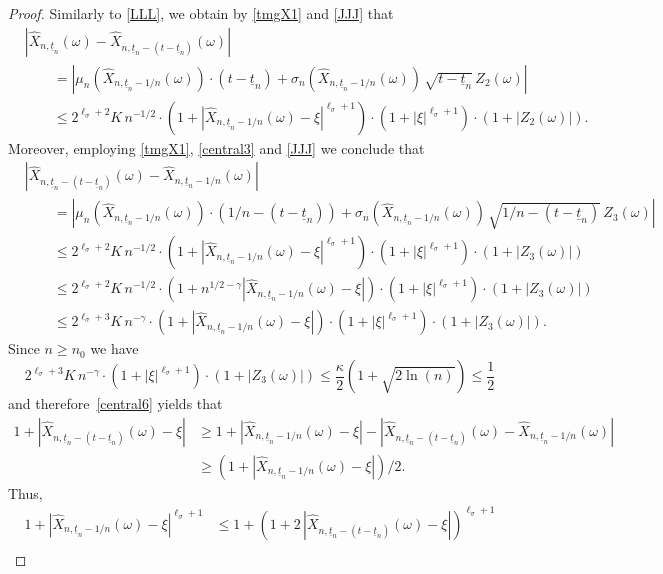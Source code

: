 \documentclass[11pt]{amsart}
\newcommand{\eul}{{\widehat X}}
\newcommand{\utn}{\underline {t}_n}
\theoremstyle{plain}
\theoremstyle{definition}
\begin{document}
\begin{proof}
Similarly to \eqref{LLL}, we obtain by \eqref{tmgX1}
and \eqref{JJJ} that
\begin{equation}\label{central5}
\begin{aligned}
& |\eul_{n,\utn}(\omega)-\eul_{n,\utn-(t-\utn)}(\omega)| \\
& \qquad =
|\mu_n(\eul_{n,\utn-1/n}(\omega))\cdot (t-\utn) + \sigma_n(\eul_{n,\utn-1/n}(\omega))\, \sqrt{t-\utn}\, Z_2(\omega)|\\
& \qquad\leq 2^{\ell_\sigma+2}K\,n^{-1/2}\cdot(1+|\eul_{n,\utn-1/n}(\omega)-\xi|^{\ell_\sigma+1})\cdot(1+|\xi|^{\ell_\sigma+1})\cdot (1+  |Z_2(\omega)|).
\end{aligned}
\end{equation}
Moreover, employing  \eqref{tmgX1}, \eqref{central3} and \eqref{JJJ} we conclude that
\begin{equation}\label{central6}
\begin{aligned}
& |\eul_{n,\utn-(t-\utn)}(\omega)-\eul_{n,\utn-1/n}(\omega)|\\
& \qquad= |\mu_n(\eul_{n,\utn-1/n}(\omega))\cdot (1/n -(t-\utn)) + \sigma_n(\eul_{n,\utn-1/n}(\omega))\, \sqrt{1/n-(t-\utn)}\, Z_3(\omega)| \\
& \qquad\leq 2^{\ell_\sigma+2}K\,n^{-1/2}\cdot(1+|\eul_{n,\utn-1/n}(\omega)-\xi|^{\ell_\sigma+1})\cdot(1+|\xi|^{\ell_\sigma+1})\cdot (1+  |Z_3(\omega)|)\\
& \qquad\leq 2^{\ell_\sigma+2}K\,n^{-1/2}\cdot(1+n^{1/2-\gamma}|\eul_{n,\utn-1/n}(\omega)-\xi|)\cdot(1+|\xi|^{\ell_\sigma+1})\cdot (1+  |Z_3(\omega)|)\\
& \qquad\leq 2^{\ell_\sigma+3}K\,n^{-\gamma}\cdot(1+|\eul_{n,\utn-1/n}(\omega)-\xi|)\cdot(1+|\xi|^{\ell_\sigma+1})\cdot (1+  |Z_3(\omega)|).
\end{aligned}
\end{equation}
Since
$n\geq n_0$
we have
\[
2^{\ell_\sigma+3}K\,n^{-\gamma}\cdot(1+|\xi|^{\ell_\sigma+1})\cdot (1+  |Z_3(\omega)|) \le \frac{\kappa}{2} (1+\sqrt{2\ln(n)})\le \frac{1}{2}
 \]
and therefore~\eqref{central6} yields that
\begin{align*}
 1 +|\eul_{n,\utn-(t-\utn)}(\omega) -\xi|  &\ge 1 + |\eul_{n,\utn-1/n}(\omega)-\xi| -|\eul_{n,\utn-(t-\utn)}(\omega)-\eul_{n,\utn-1/n}(\omega)|\\
&\ge (1 + |\eul_{n,\utn-1/n}(\omega)-\xi|)/2.
\end{align*}
Thus,
\begin{equation}\label{central7}
\begin{aligned}
1 + |\eul_{n,\utn-1/n}(\omega)-\xi|^{\ell_\sigma+1}&\leq 1+(1+2\,|\eul_{n,\utn-(t-\utn)}(\omega) -\xi| )^{\ell_\sigma+1}\\

\end{aligned}
\end{equation}
\end{proof}
\end{document}
